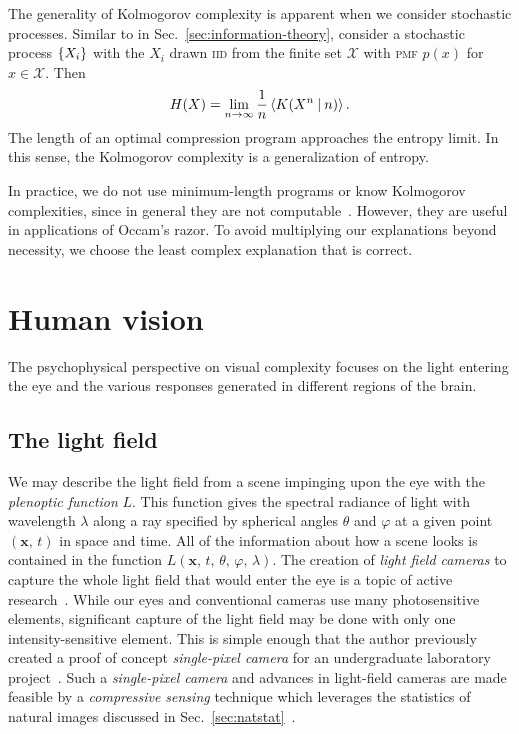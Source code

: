 \documentclass[aps,reprint,floatfix]{revtex4-2}
\theoremstyle{plain}
\theoremstyle{definition}
\renewcommand\phi\varphi%
\begin{document}
The generality of Kolmogorov complexity is apparent when we consider stochastic
processes. Similar to in Sec.~\ref{sec:information-theory}, consider a
stochastic process $\qty{X_i}$ with the $X_i$ drawn \textsc{iid} from the finite set
$\mathcal{X}$ with \textsc{pmf} $p(x)$ for $x \in \mathcal{X}$.
Then~\cite[p.~473]{cover}
\begin{equation}
  H(X)
  = \lim_{n \to \infty} \frac{1}{n}\ev{K(X^n \mathbin{|} n)}.
  \label{eq:complexity-entropy}
\end{equation}
The length of an optimal compression program approaches the entropy limit. In
this sense, the Kolmogorov complexity is a generalization of entropy.

In practice, we do not use minimum-length programs or know Kolmogorov
complexities, since in general they are not computable~\cite[p.~482]{cover}.
However, they are useful in applications of Occam's razor. To avoid multiplying
our explanations beyond necessity, we choose the least complex explanation that
is correct.

\section{Human vision}\label{sec:vision}

The psychophysical perspective on visual complexity focuses on the light
entering the eye and the various responses generated in different regions of the
brain.

\subsection{The light field}\label{sec:light-field}

We may describe the light field from a scene impinging upon the eye with the
\emph{plenoptic function} $L$. This function gives the spectral radiance of
light with wavelength $\lambda$ along a ray specified by spherical angles
$\theta$ and $\phi$ at a given point $(\bm{x},\, t)$ in space and time. All of
the information about how a scene looks is contained in the function
$L(\bm{x},\, t,\, \theta,\, \phi,\, \lambda)$. The creation of \emph{light field
cameras} to capture the whole light field that would enter the eye is a topic
of active research~\cite{light-field}. While our eyes and conventional cameras
use many photosensitive elements, significant capture of the light field may be
done with only one intensity-sensitive element. This is simple enough that the
author previously created a proof of concept \emph{single-pixel camera} for an
undergraduate laboratory project~\cite{csjlab,single-pixel}. Such a \emph{single-pixel
camera} and advances in light-field cameras are made feasible by a
\emph{compressive sensing} technique which leverages the statistics of natural
images discussed in Sec.~\ref{sec:natstat}~\cite{compressed-sensing}.
\end{document}
